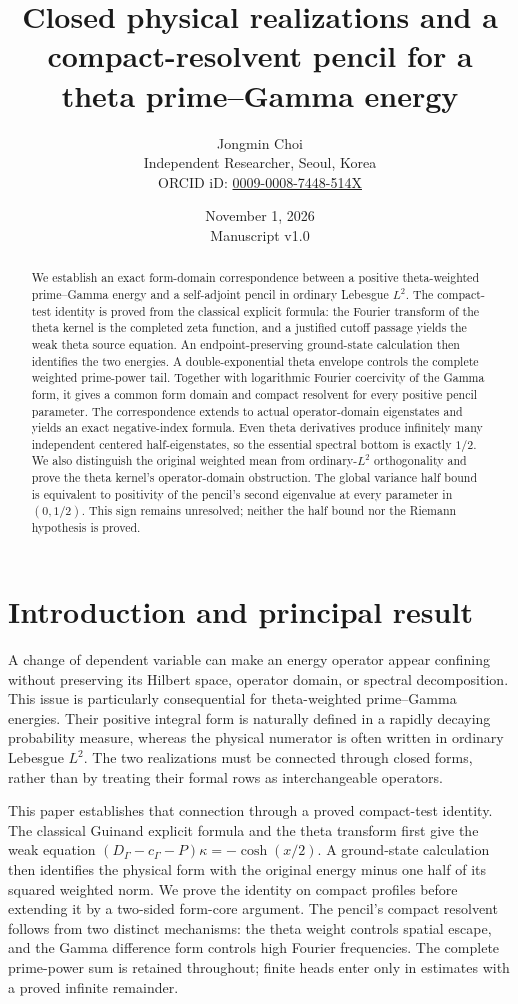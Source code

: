 \documentclass[11pt,a4paper]{article}
\title{Closed physical realizations and a compact-resolvent pencil for a theta prime--Gamma energy}
\author{Jongmin Choi\\[3pt]\small Independent Researcher, Seoul, Korea\\\small ORCID iD: \href{https://orcid.org/0009-0008-7448-514X}{0009-0008-7448-514X}}
\date{November 1, 2026\\[3pt]\small Manuscript v1.0}
\numberwithin{equation}{section}
\theoremstyle{remark}
\newcommand{\cg}{c_{\Gamma}}
\begin{document}
\maketitle
\begin{abstract}
We establish an exact form-domain correspondence between a positive theta-weighted prime--Gamma energy and a self-adjoint pencil in ordinary Lebesgue $L^2$. The compact-test identity is proved from the classical explicit formula: the Fourier transform of the theta kernel is the completed zeta function, and a justified cutoff passage yields the weak theta source equation. An endpoint-preserving ground-state calculation then identifies the two energies. A double-exponential theta envelope controls the complete weighted prime-power tail. Together with logarithmic Fourier coercivity of the Gamma form, it gives a common form domain and compact resolvent for every positive pencil parameter. The correspondence extends to actual operator-domain eigenstates and yields an exact negative-index formula. Even theta derivatives produce infinitely many independent centered half-eigenstates, so the essential spectral bottom is exactly $1/2$. We also distinguish the original weighted mean from ordinary-$L^2$ orthogonality and prove the theta kernel's operator-domain obstruction. The global variance half bound is equivalent to positivity of the pencil's second eigenvalue at every parameter in $(0,1/2)$. This sign remains unresolved; neither the half bound nor the Riemann hypothesis is proved.
\end{abstract}

\section{Introduction and principal result}

A change of dependent variable can make an energy operator appear confining without preserving its Hilbert space, operator domain, or spectral decomposition. This issue is particularly consequential for theta-weighted prime--Gamma energies. Their positive integral form is naturally defined in a rapidly decaying probability measure, whereas the physical numerator is often written in ordinary Lebesgue $L^2$. The two realizations must be connected through closed forms, rather than by treating their formal rows as interchangeable operators.

This paper establishes that connection through a proved compact-test identity. The classical Guinand explicit formula and the theta transform first give the weak equation $(D_\Gamma-\cg-P)\kappa=-\cosh(x/2)$. A ground-state calculation then identifies the physical form with the original energy minus one half of its squared weighted norm. We prove the identity on compact profiles before extending it by a two-sided form-core argument. The pencil's compact resolvent follows from two distinct mechanisms: the theta weight controls spatial escape, and the Gamma difference form controls high Fourier frequencies. The complete prime-power sum is retained throughout; finite heads enter only in estimates with a proved infinite remainder.
\end{document}
